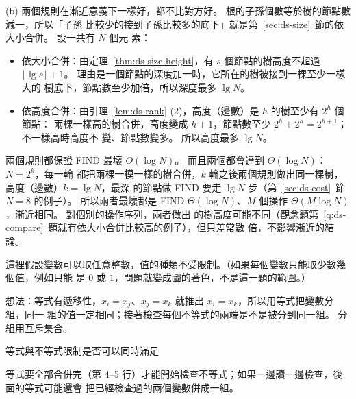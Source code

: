 (b) 兩個規則在漸近意義下一樣好，都不比對方好。 根的子孫個數等於樹的節點數減一，所以「子孫
比較少的接到子孫比較多的底下」就是第~\ref{sec:ds-size}~節的依大小合併。 設一共有 $N$ 個元
素：
\begin{itemize}
\item 依大小合併：由定理~\ref{thm:ds-size-height}，有 $s$ 個節點的樹高度不超過
$\lfloor \lg s \rfloor + 1$。 理由是一個節點的深度加一時，它所在的樹被接到一棵至少一樣大的
樹底下，節點數至少加倍，所以深度最多 $\lg N$。
\item 依高度合併：由引理~\ref{lem:ds-rank} (2)，高度（邊數）是 $h$ 的樹至少有 $2^h$ 個節點：
兩棵一樣高的樹合併，高度變成 $h + 1$，節點數至少 $2^h + 2^h = 2^{h+1}$；不一樣高時高度不
變、節點數變多。 所以高度最多 $\lg N$。
\end{itemize}
兩個規則都保證 FIND 最壞 $O(\log N)$。 而且兩個都會達到 $\Theta(\log N)$：$N = 2^k$，每一輪
都把兩棵一模一樣的樹合併，$k$ 輪之後兩個規則做出同一棵樹，高度（邊數）$k = \lg N$，最深
的節點做 FIND 要走 $\lg N$ 步（第~\ref{sec:ds-cost}~節 $N = 8$ 的例子）。 所以兩者最壞都是
FIND $\Theta(\log N)$、$M$ 個操作 $\Theta(M \log N)$，漸近相同。 對個別的操作序列，兩者做出
的樹高度可能不同（觀念題第~\ref{q:ds-compare}~題就有依大小合併比較高的例子），但只差常數
倍，不影響漸近的結論。

這裡假設變數可以取任意整數，值的種類不受限制。（如果每個變數只能取少數幾個值，例如只能
是 $0$ 或 $1$，問題就變成圖的著色，不是這一題的範圍。）

想法：等式有遞移性，$x_i = x_j$、$x_j = x_k$ 就推出 $x_i = x_k$，所以用等式把變數分組，同一
組的值一定相同；接著檢查每個不等式的兩端是不是被分到同一組。 分組用互斥集合。

\begin{pseudo}[label=alg:ds-px-constraint, unbreakable]{等式與不等式限制是否可以同時滿足}
        \State {}
    \EndFor
        \State {}
    \EndFor
            \State \Return \FALSE
        \EndIf
    \EndFor
    \State \Return \TRUE
\EndFunction
\end{pseudo}

等式要全部合併完（第 4--5 行）才能開始檢查不等式；如果一邊讀一邊檢查，後面的等式可能還會
把已經檢查過的兩個變數併成一組。


